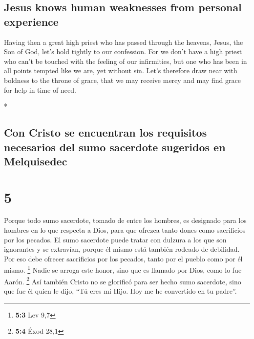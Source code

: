 \begin{paracol}{2}
\begin{otherlanguage}{english}
\hypertarget{jesus-knows-human-weaknesses-from-personal-experience}{%
\subsection{Jesus knows human weaknesses from personal
experience}\label{jesus-knows-human-weaknesses-from-personal-experience}}

 Having then a great high priest who has passed through
the heavens, Jesus, the Son of God, let's hold tightly to our
confession.  For we don't have a high priest who can't be
touched with the feeling of our infirmities, but one who has been in all
points tempted like we are, yet without sin.  Let's
therefore draw near with boldness to the throne of grace, that we may
receive mercy and may find grace for help in time of need.

\end{otherlanguage}

\switchcolumn[0]*

\hypertarget{con-cristo-se-encuentran-los-requisitos-necesarios-del-sumo-sacerdote-sugeridos-en-melquisedec}{%
\subsection{Con Cristo se encuentran los requisitos necesarios del sumo
sacerdote sugeridos en
Melquisedec}\label{con-cristo-se-encuentran-los-requisitos-necesarios-del-sumo-sacerdote-sugeridos-en-melquisedec}}

\hypertarget{section-8}{%
\section{5}\label{section-8}}

 Porque todo sumo sacerdote, tomado de entre los hombres,
es designado para los hombres en lo que respecta a Dios, para que
ofrezca tanto dones como sacrificios por los pecados.  El
sumo sacerdote puede tratar con dulzura a los que son ignorantes y se
extravían, porque él mismo está también rodeado de debilidad.
 Por eso debe ofrecer sacrificios por los pecados, tanto
por el pueblo como por él mismo. \footnote{\textbf{5:3} Lev 9,7}
 Nadie se arroga este honor, sino que es llamado por Dios,
como lo fue Aarón. \footnote{\textbf{5:4} Éxod 28,1}  Así
también Cristo no se glorificó para ser hecho sumo sacerdote, sino que
fue él quien le dijo, ``Tú eres mi Hijo. Hoy me he convertido en tu
padre''.


\end{paracol}
